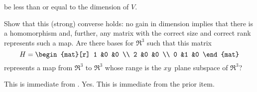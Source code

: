 \begin{exercises}
     be less than or equal to the dimension of $V$.
     \begin{exparts}
       \partsitem Show that this (strong) converse holds: 
          no gain in dimension implies that 
          there is a homomorphism and, further, 
          any matrix with the correct size and correct rank 
          represents such a map.
       \partsitem Are there bases for $\Re^3$ such that
          this matrix
          \begin{equation*}
            H=\begin{mat}[r]
                1  &0  &0 \\
                2  &0  &0 \\
                0  &1  &0 
              \end{mat}
          \end{equation*}
          represents a map from $\Re^3$ to $\Re^3$ whose range is
          the $xy$~plane subspace of $\Re^3$?
     \end{exparts}
     \begin{answer}
       \begin{exparts}
         \partsitem  This is immediate from
           .
         \partsitem Yes.
            This is immediate from the prior item.


\end{exparts}
\end{answer}
\end{exercises}
